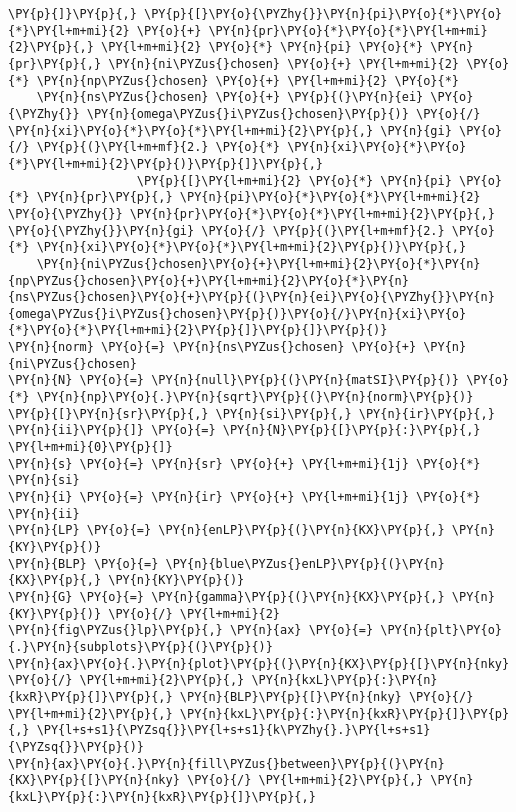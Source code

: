 \begin{Verbatim}[commandchars=\\\{\}]
\PY{p}{]}\PY{p}{,} \PY{p}{[}\PY{o}{\PYZhy{}}\PY{n}{pi}\PY{o}{*}\PY{o}{*}\PY{l+m+mi}{2} \PY{o}{+} \PY{n}{pr}\PY{o}{*}\PY{o}{*}\PY{l+m+mi}{2}\PY{p}{,} \PY{l+m+mi}{2} \PY{o}{*} \PY{n}{pi} \PY{o}{*} \PY{n}{pr}\PY{p}{,} \PY{n}{ni\PYZus{}chosen} \PY{o}{+} \PY{l+m+mi}{2} \PY{o}{*} \PY{n}{np\PYZus{}chosen} \PY{o}{+} \PY{l+m+mi}{2} \PY{o}{*}
    \PY{n}{ns\PYZus{}chosen} \PY{o}{+} \PY{p}{(}\PY{n}{ei} \PY{o}{\PYZhy{}} \PY{n}{omega\PYZus{}i\PYZus{}chosen}\PY{p}{)} \PY{o}{/} \PY{n}{xi}\PY{o}{*}\PY{o}{*}\PY{l+m+mi}{2}\PY{p}{,} \PY{n}{gi} \PY{o}{/} \PY{p}{(}\PY{l+m+mf}{2.} \PY{o}{*} \PY{n}{xi}\PY{o}{*}\PY{o}{*}\PY{l+m+mi}{2}\PY{p}{)}\PY{p}{]}\PY{p}{,}
                  \PY{p}{[}\PY{l+m+mi}{2} \PY{o}{*} \PY{n}{pi} \PY{o}{*} \PY{n}{pr}\PY{p}{,} \PY{n}{pi}\PY{o}{*}\PY{o}{*}\PY{l+m+mi}{2} \PY{o}{\PYZhy{}} \PY{n}{pr}\PY{o}{*}\PY{o}{*}\PY{l+m+mi}{2}\PY{p}{,} \PY{o}{\PYZhy{}}\PY{n}{gi} \PY{o}{/} \PY{p}{(}\PY{l+m+mf}{2.} \PY{o}{*} \PY{n}{xi}\PY{o}{*}\PY{o}{*}\PY{l+m+mi}{2}\PY{p}{)}\PY{p}{,}
    \PY{n}{ni\PYZus{}chosen}\PY{o}{+}\PY{l+m+mi}{2}\PY{o}{*}\PY{n}{np\PYZus{}chosen}\PY{o}{+}\PY{l+m+mi}{2}\PY{o}{*}\PY{n}{ns\PYZus{}chosen}\PY{o}{+}\PY{p}{(}\PY{n}{ei}\PY{o}{\PYZhy{}}\PY{n}{omega\PYZus{}i\PYZus{}chosen}\PY{p}{)}\PY{o}{/}\PY{n}{xi}\PY{o}{*}\PY{o}{*}\PY{l+m+mi}{2}\PY{p}{]}\PY{p}{]}\PY{p}{)}
\PY{n}{norm} \PY{o}{=} \PY{n}{ns\PYZus{}chosen} \PY{o}{+} \PY{n}{ni\PYZus{}chosen}
\PY{n}{N} \PY{o}{=} \PY{n}{null}\PY{p}{(}\PY{n}{matSI}\PY{p}{)} \PY{o}{*} \PY{n}{np}\PY{o}{.}\PY{n}{sqrt}\PY{p}{(}\PY{n}{norm}\PY{p}{)}
\PY{p}{[}\PY{n}{sr}\PY{p}{,} \PY{n}{si}\PY{p}{,} \PY{n}{ir}\PY{p}{,} \PY{n}{ii}\PY{p}{]} \PY{o}{=} \PY{n}{N}\PY{p}{[}\PY{p}{:}\PY{p}{,} \PY{l+m+mi}{0}\PY{p}{]}
\PY{n}{s} \PY{o}{=} \PY{n}{sr} \PY{o}{+} \PY{l+m+mi}{1j} \PY{o}{*} \PY{n}{si}
\PY{n}{i} \PY{o}{=} \PY{n}{ir} \PY{o}{+} \PY{l+m+mi}{1j} \PY{o}{*} \PY{n}{ii}
\PY{n}{LP} \PY{o}{=} \PY{n}{enLP}\PY{p}{(}\PY{n}{KX}\PY{p}{,} \PY{n}{KY}\PY{p}{)}
\PY{n}{BLP} \PY{o}{=} \PY{n}{blue\PYZus{}enLP}\PY{p}{(}\PY{n}{KX}\PY{p}{,} \PY{n}{KY}\PY{p}{)}
\PY{n}{G} \PY{o}{=} \PY{n}{gamma}\PY{p}{(}\PY{n}{KX}\PY{p}{,} \PY{n}{KY}\PY{p}{)} \PY{o}{/} \PY{l+m+mi}{2}
\PY{n}{fig\PYZus{}lp}\PY{p}{,} \PY{n}{ax} \PY{o}{=} \PY{n}{plt}\PY{o}{.}\PY{n}{subplots}\PY{p}{(}\PY{p}{)}
\PY{n}{ax}\PY{o}{.}\PY{n}{plot}\PY{p}{(}\PY{n}{KX}\PY{p}{[}\PY{n}{nky} \PY{o}{/} \PY{l+m+mi}{2}\PY{p}{,} \PY{n}{kxL}\PY{p}{:}\PY{n}{kxR}\PY{p}{]}\PY{p}{,} \PY{n}{BLP}\PY{p}{[}\PY{n}{nky} \PY{o}{/} \PY{l+m+mi}{2}\PY{p}{,} \PY{n}{kxL}\PY{p}{:}\PY{n}{kxR}\PY{p}{]}\PY{p}{,} \PY{l+s+s1}{\PYZsq{}}\PY{l+s+s1}{k\PYZhy{}.}\PY{l+s+s1}{\PYZsq{}}\PY{p}{)}
\PY{n}{ax}\PY{o}{.}\PY{n}{fill\PYZus{}between}\PY{p}{(}\PY{n}{KX}\PY{p}{[}\PY{n}{nky} \PY{o}{/} \PY{l+m+mi}{2}\PY{p}{,} \PY{n}{kxL}\PY{p}{:}\PY{n}{kxR}\PY{p}{]}\PY{p}{,}

\end{Verbatim}
